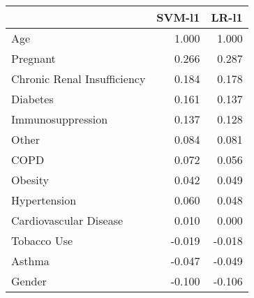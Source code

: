 \begin{tabular}{lrr}
\toprule
{} &  SVM-l1 &  LR-l1 \\
\midrule
Age                         &   1.000 &  1.000 \\
Pregnant                    &   0.266 &  0.287 \\
Chronic Renal Insufficiency &   0.184 &  0.178 \\
Diabetes                    &   0.161 &  0.137 \\
Immunosuppression           &   0.137 &  0.128 \\
Other                       &   0.084 &  0.081 \\
COPD                        &   0.072 &  0.056 \\
Obesity                     &   0.042 &  0.049 \\
Hypertension                &   0.060 &  0.048 \\
Cardiovascular Disease      &   0.010 &  0.000 \\
Tobacco Use                 &  -0.019 & -0.018 \\
Asthma                      &  -0.047 & -0.049 \\
Gender                      &  -0.100 & -0.106 \\
\bottomrule
\end{tabular}
